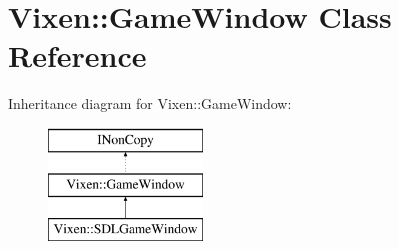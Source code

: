 \hypertarget{class_vixen_1_1_game_window}{}\section{Vixen\+:\+:Game\+Window Class Reference}
\label{class_vixen_1_1_game_window}
Inheritance diagram for Vixen\+:\+:Game\+Window\+:\begin{figure}[H]
\begin{center}
\leavevmode
\includegraphics[height=3.000000cm]{class_vixen_1_1_game_window}
\end{center}
\end{figure}
